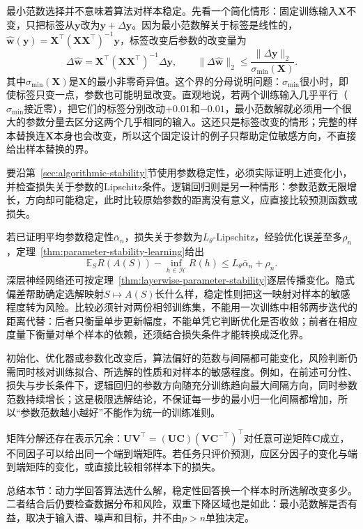 最小范数选择并不意味着算法对样本稳定。先看一个简化情形：固定训练输入$\bm X$不变，只把标签从$\bm y$改为$\bm y+\Delta\bm y$。因为最小范数解关于标签是线性的，$\hat{\bm w}(\bm y)=\bm X^\top(\bm X\bm X^\top)^{-1}\bm y$，标签改变后参数的改变量为
\[
 \Delta\hat{\bm w}=\bm X^\top(\bm X\bm X^\top)^{-1}\Delta\bm y,
 \qquad
 \|\Delta\hat{\bm w}\|_2\leq
 \frac{\|\Delta\bm y\|_2}{\sigma_{\min}(\bm X)}.
\]
其中$\sigma_{\min}(\bm X)$是$\bm X$的最小非零奇异值。这个界的分母说明问题：$\sigma_{\min}$很小时，即使标签只变一点，参数也可能明显改变。直观地说，若两个训练输入几乎平行（$\sigma_{\min}$接近零），把它们的标签分别改动$+0.01$和$-0.01$，最小范数解就必须用一个很大的参数分量去区分这两个几乎相同的输入。这还只是标签改变的情形；完整的样本替换连$\bm X$本身也会改变，所以这个固定设计的例子只帮助定位敏感方向，不直接给出样本替换的界。

要沿第~\ref{sec:algorithmic-stability}节使用参数稳定性，必须实际证明上述变化小，并检查损失关于参数的Lipschitz条件。逻辑回归则是另一种情形：参数范数无限增长，方向却可能稳定，此时比较原始参数的距离没有意义，应直接比较预测函数或损失。

若已证明平均参数稳定性$\bar\alpha_n$，损失关于参数为$L_\theta$-Lipschitz，经验优化误差至多$\rho_n$，定理~\ref{thm:parameter-stability-learning}给出
\[
 \mathbb E_S R(A(S))-\inf_{h\in\mathcal H}R(h)
 \leq L_\theta\bar\alpha_n+\rho_n.
\]
深层神经网络还可按定理~\ref{thm:layerwise-parameter-stability}逐层传播变化。隐式偏差帮助确定选解映射$S\mapsto A(S)$长什么样，稳定性则把这一映射对样本的敏感程度转为风险。比较必须针对两份相邻训练集，不能用一次训练中相邻两步迭代的距离代替：后者只衡量单步更新幅度，不能单凭它判断优化是否收敛；前者在相应度量下衡量对单个样本的依赖，还须结合损失条件才能转换成泛化界。

初始化、优化器或参数化改变后，算法偏好的范数与间隔都可能变化，风险判断仍需同时核对训练拟合、所选解的性质和对样本的敏感程度。例如，在前述可分性、损失与步长条件下，逻辑回归的参数方向随充分训练趋向最大间隔方向，同时参数范数持续增长；这是极限选解结论，不保证每一步的最小归一化间隔都增加，所以“参数范数越小越好”不能作为统一的训练准则。

矩阵分解还存在表示冗余：$\bm U\bm V^\top=(\bm U\bm C)(\bm V\bm C^{-\top})^\top$对任意可逆矩阵$\bm C$成立，不同因子可以给出同一个端到端矩阵。若任务只评价预测，应区分因子的变化与端到端矩阵的变化，或直接比较相邻样本下的损失。

总结本节：动力学回答算法选什么解，稳定性回答换一个样本时所选解改变多少。二者结合后仍要检查数据分布和风险，双重下降区域也是如此：最小范数解是否有益，取决于输入谱、噪声和目标，并不由$p>n$单独决定。


